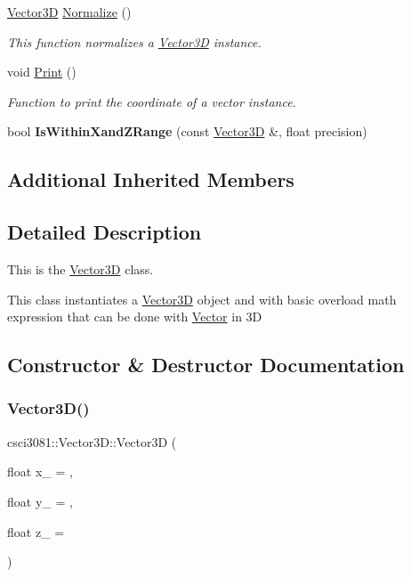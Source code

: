 \begin{DoxyCompactItemize}
\hyperlink{classcsci3081_1_1Vector3D}{Vector3D} \hyperlink{classcsci3081_1_1Vector3D_ad57f6121d4aeb7912d93a2858ca43ae0}{Normalize} ()
\begin{DoxyCompactList}\small\item\em This function normalizes a \hyperlink{classcsci3081_1_1Vector3D}{Vector3D} instance. \end{DoxyCompactList}\item 
void \hyperlink{classcsci3081_1_1Vector3D_a0a010ab4671901254dad6fc2beedadf7}{Print} ()
\begin{DoxyCompactList}\small\item\em Function to print the coordinate of a vector instance. \end{DoxyCompactList}\item 
\mbox{\label{classcsci3081_1_1Vector3D_a813e905aba36475b93b6bbe46ec3f39d}} 
bool {\bfseries Is\+Within\+Xand\+Z\+Range} (const \hyperlink{classcsci3081_1_1Vector3D}{Vector3D} \&, float precision)
\end{DoxyCompactItemize}
\subsection*{Additional Inherited Members}


\subsection{Detailed Description}
This is the \hyperlink{classcsci3081_1_1Vector3D}{Vector3D} class. 

This class instantiates a \hyperlink{classcsci3081_1_1Vector3D}{Vector3D} object and with basic overload math expression that can be done with \hyperlink{classcsci3081_1_1Vector}{Vector} in 3D 

\subsection{Constructor \& Destructor Documentation}
\mbox{\label{classcsci3081_1_1Vector3D_a34cb5ed59fd4bd810516eea03143f186}} 
\subsubsection{\texorpdfstring{Vector3\+D()}{Vector3D()}\hspace{0.1cm}{\footnotesize\ttfamily [1/3]}}
{\footnotesize\ttfamily csci3081\+::\+Vector3\+D\+::\+Vector3D (\begin{DoxyParamCaption}\item[{float}]{x\+\_\+ = {},  }\item[{float}]{y\+\_\+ = {},  }\item[{float}]{z\+\_\+ = {} }\end{DoxyParamCaption})}




